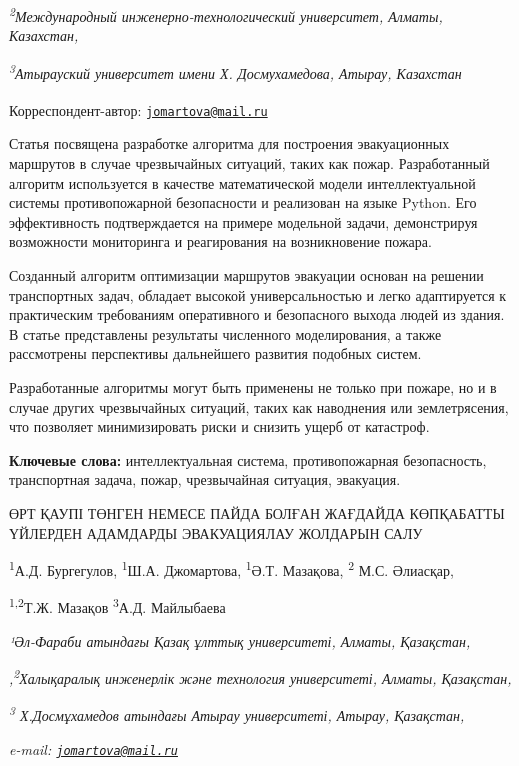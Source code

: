\emph{\textsuperscript{2}Международный инженерно-технологический
университет, Алматы, Казахстан,}

\emph{\textsuperscript{3}Атырауский университет имени Х. Досмухамедова,
Атырау, Казахстан}

{\bfseries \textsuperscript{\envelope }}Корреспондент-автор:
\href{mailto:jomartova@mail.ru}{\nolinkurl{jomartova@mail.ru}}

Статья посвящена разработке алгоритма для построения эвакуационных
маршрутов в случае чрезвычайных ситуаций, таких как пожар. Разработанный
алгоритм используется в качестве математической модели интеллектуальной
системы противопожарной безопасности и реализован на языке Python. Его
эффективность подтверждается на примере модельной задачи, демонстрируя
возможности мониторинга и реагирования на возникновение пожара.

Созданный алгоритм оптимизации маршрутов эвакуации основан на решении
транспортных задач, обладает высокой универсальностью и легко
адаптируется к практическим требованиям оперативного и безопасного
выхода людей из здания. В статье представлены результаты численного
моделирования, а также рассмотрены перспективы дальнейшего развития
подобных систем.

Разработанные алгоритмы могут быть применены не только при пожаре, но и
в случае других чрезвычайных ситуаций, таких как наводнения или
землетрясения, что позволяет минимизировать риски и снизить ущерб от
катастроф.

{\bfseries Ключевые слова:} интеллектуальная система, противопожарная
безопасность, транспортная задача, пожар, чрезвычайная ситуация,
эвакуация.

ӨРТ ҚАУПІ ТӨНГЕН НЕМЕСЕ ПАЙДА БОЛҒАН ЖАҒДАЙДА КӨПҚАБАТТЫ ҮЙЛЕРДЕН
АДАМДАРДЫ ЭВАКУАЦИЯЛАУ ЖОЛДАРЫН САЛУ

\textsuperscript{1}А.Д. Бургегулов, \textsuperscript{1}Ш.А.
Джомартова\textsuperscript{\envelope }, \textsuperscript{1}Ә.Т. Мазақова,
\textsuperscript{2} М.С. Әлиасқар,

\textsuperscript{1,2}Т.Ж. Мазақов \textsuperscript{3}А.Д. Майлыбаева

\emph{¹Әл-Фараби атындағы Қазақ ұлттық университеті, Алматы, Қазақстан,}

\emph{,\textsuperscript{2}Халықаралық инженерлік және технология
университеті, Алматы, Қазақстан,}

\emph{\textsuperscript{3} Х.Досмұхамедов атындағы Атырау университеті,
Атырау, Қазақстан,}

\emph{e-mail:
\href{mailto:jomartova@mail.ru}{\nolinkurl{jomartova@mail.ru}}}


